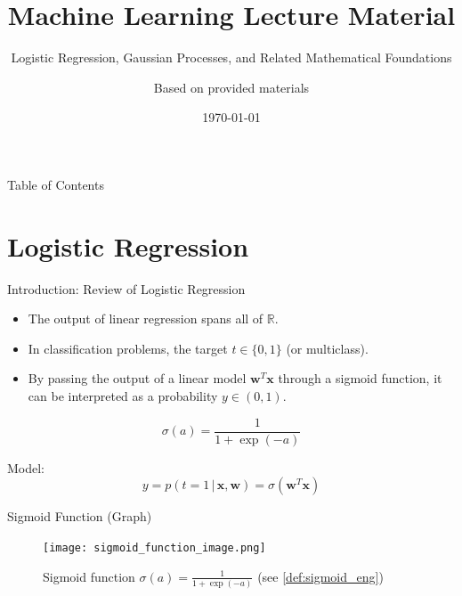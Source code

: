 \documentclass{beamer} %
\title{Machine Learning Lecture Material}
\subtitle{Logistic Regression, Gaussian Processes, and Related Mathematical Foundations}
\author{Based on provided materials}
\institute{Your University / Organization Name (Please change accordingly)}
\date{\today}
\newcommand{\vect}[1]{\mathbf{#1}}
\newcommand{\given}{\,|\,}
\begin{document}
\begin{frame}
  \titlepage
\end{frame}

\begin{frame}{Table of Contents}
  \tableofcontents
\end{frame}

\section{Logistic Regression}
\begin{frame}{Introduction: Review of Logistic Regression}
  \begin{itemize}
    \item The output of linear regression spans all of $\mathbb{R}$.
    \item In classification problems, the target $t \in \{0, 1\}$ (or multiclass).
    \item By passing the output of a linear model $\vect{w}^T \vect{x}$ through a sigmoid function, it can be interpreted as a probability $y \in (0, 1)$.
  \end{itemize}
  \vspace{1em}
  \begin{dfn}
  \label{def:sigmoid_eng}
  \begin{equation*}
    \sigma(a) = \frac{1}{1 + \exp(-a)}
  \end{equation*}
  \end{dfn}
  Model:
  \begin{equation*}
    y = p(t=1 \given \vect{x}, \vect{w}) = \sigma(\vect{w}^T \vect{x})
  \end{equation*}
\end{frame}

\begin{frame}{Sigmoid Function (Graph)}
  \begin{figure}
    \centering
    \texttt{[image: sigmoid\_function\_image.png]}
    \caption{Sigmoid function $\sigma(a) = \frac{1}{1 + \exp(-a)}$ (see \cref{def:sigmoid_eng})}
  \end{figure}
\end{frame}
\end{document}

